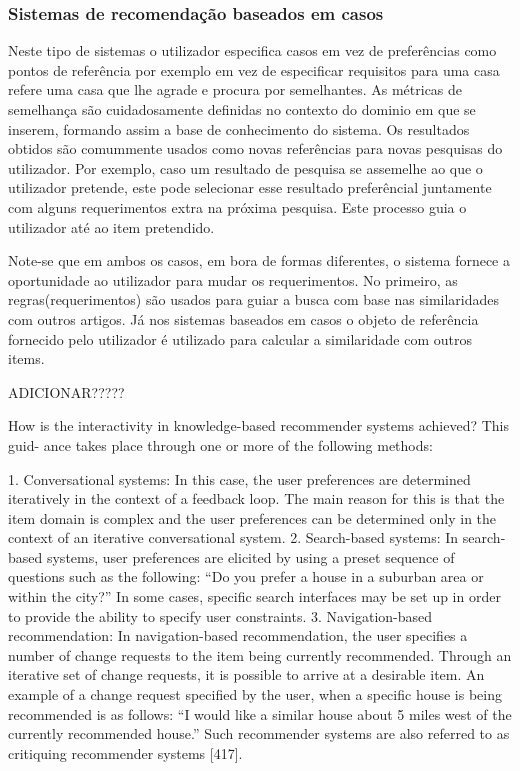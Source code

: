 \subsubsection{Sistemas de recomendação baseados em casos}

Neste tipo de sistemas o utilizador especifica casos  em vez de preferências como pontos de referência por exemplo em vez de especificar requisitos para uma casa refere uma casa que lhe agrade e procura por semelhantes. As métricas de semelhança são cuidadosamente definidas no contexto do dominio em que se inserem, formando assim a base de conhecimento do sistema. Os resultados obtidos são comummente usados como novas referências para novas pesquisas do utilizador.  Por exemplo, caso um resultado de pesquisa se assemelhe ao que o utilizador pretende, este pode selecionar esse resultado preferêncial juntamente com alguns requerimentos extra na próxima pesquisa. Este processo guia o utilizador até ao item pretendido.

Note-se que em ambos os casos, em bora de formas diferentes, o sistema fornece a oportunidade ao utilizador para mudar os requerimentos.
No primeiro, as regras(requerimentos) são usados para guiar a busca com base nas similaridades com outros artigos. Já nos sistemas baseados em casos o objeto de referência fornecido pelo utilizador é utilizado para calcular a similaridade com outros items.
 



ADICIONAR?????

How is the interactivity in knowledge-based recommender systems achieved? This guid- ance takes place through one or more of the following methods:

1. Conversational systems: In this case, the user preferences are determined iteratively in the context of a feedback loop. The main reason for this is that the item domain is complex and the user preferences can be determined only in the context of an iterative conversational system.
2. Search-based systems: In search-based systems, user preferences are elicited by using a preset sequence of questions such as the following: “Do you prefer a house in a suburban area or within the city?” In some cases, specific search interfaces may be set up in order to provide the ability to specify user constraints.
3. Navigation-based recommendation: In navigation-based recommendation, the user specifies a number of change requests to the item being currently recommended. Through an iterative set of change requests, it is possible to arrive at a desirable item. An example of a change request specified by the user, when a specific house is being recommended is as follows: “I would like a similar house about 5 miles west of the currently recommended house.” Such recommender systems are also referred to as critiquing recommender systems [417].


